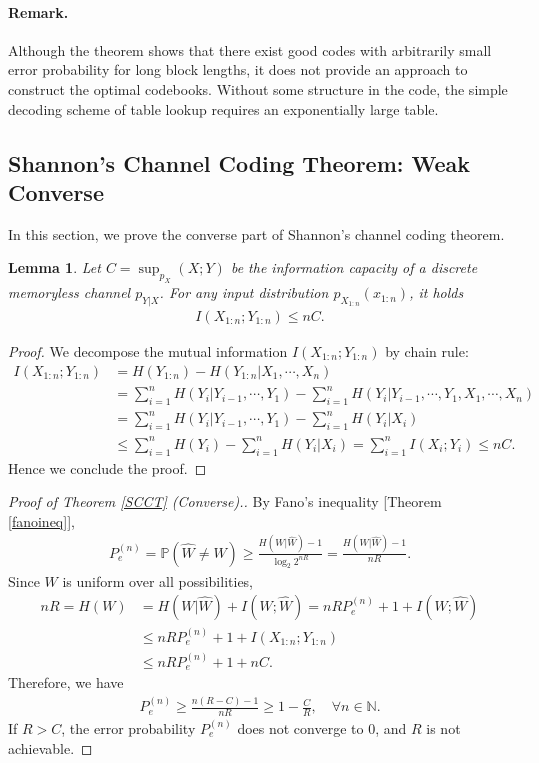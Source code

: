 \documentclass{article}
\numberwithin{equation}{section}
\newcommand{\bbN}{\mathbb{N}}
\newcommand{\bbP}{\mathbb{P}}
\newcommand{\wh}{\widehat}
\theoremstyle{plain}
\newtheorem{lemma}[theorem]{Lemma}
\theoremstyle{definition}
\begin{document}
\paragraph{Remark.} Although the theorem shows that there exist good codes with arbitrarily small error probability for long block lengths, it does not provide an approach to construct the optimal codebooks. Without some structure in the code, the simple decoding scheme of table lookup requires an exponentially large table. 

\subsection{Shannon's Channel Coding Theorem: Weak Converse}
In this section, we prove the converse part of Shannon's channel coding theorem.
\begin{lemma}\label{scctconverselemma}
Let $C=\sup_{p_X}(X;Y)$ be the information capacity of a discrete memoryless channel $p_{Y|X}$. For any input distribution $p_{X_{1:n}}(x_{1:n})$, it holds
\begin{align*}
	I(X_{1:n};Y_{1:n})\leq nC.
\end{align*}
\end{lemma}
\begin{proof}
We decompose the mutual information $I(X_{1:n};Y_{1:n})$ by chain rule:
\begin{align*}
	I(X_{1:n};Y_{1:n})&=H(Y_{1:n})-H(Y_{1:n}|X_1,\cdots,X_n)\\
	&=\sum_{i=1}^n H(Y_{i}|Y_{i-1},\cdots,Y_1)-\sum_{i=1}^n H(Y_{i}|Y_{i-1},\cdots,Y_1,X_1,\cdots,X_n)\\
	&=\sum_{i=1}^n H(Y_{i}|Y_{i-1},\cdots,Y_1)-\sum_{i=1}^n H(Y_i|X_i)\\
	&\leq\sum_{i=1}^n H(Y_{i})-\sum_{i=1}^n H(Y_i|X_i)=\sum_{i=1}^n I(X_i;Y_i)\leq nC.
\end{align*}
Hence we conclude the proof.
\end{proof}
\begin{proof}[Proof of Theorem \ref{SCCT} (Converse).]
By Fano's inequality [Theorem \ref{fanoineq}], 
\begin{align*}
	P_e^{(n)}=\bbP(\wh{W}\neq W)\geq\frac{H(W|\wh{W})-1}{\log_2 2^{nR}}=\frac{H(W|\wh{W})-1}{nR}.
\end{align*}
Since $W$ is uniform over all possibilities,
\begin{align*}
	nR=H(W)&=H(W|\wh{W})+I(W;\wh{W})=nRP_e^{(n)}+1+I(W;\wh{W})\\
	&\leq nRP_e^{(n)}+1+I(X_{1:n};Y_{1:n})\tag{By data processing inequality}\\
	&\leq nRP_e^{(n)}+1+nC.
\end{align*}
Therefore, we have
\begin{align*}
	P_e^{(n)}\geq\frac{n(R-C)-1}{nR}\geq 1-\frac{C}{R},\quad\forall n\in\bbN.
\end{align*}
If $R>C$, the error probability $P_e^{(n)}$ does not converge to $0$, and $R$ is not achievable.
\end{proof}
\end{document}
